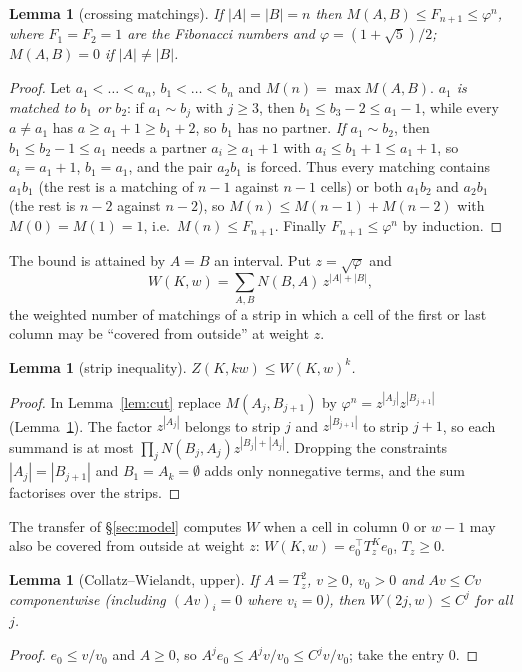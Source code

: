 \documentclass[11pt]{amsart}
\newtheorem{lemma}[theorem]{Lemma}
\theoremstyle{definition}
\theoremstyle{remark}
\begin{document}
\begin{lemma}[crossing matchings]\label{lem:fib}
If $|A| = |B| = n$ then $M(A, B) \le F_{n+1} \le \varphi^n$, where $F_1 = F_2 = 1$ are the
Fibonacci numbers and $\varphi = (1 + \sqrt 5)/2$; $M(A, B) = 0$ if $|A| \ne |B|$.
\end{lemma}
\begin{proof}
Let $a_1 < \dots < a_n$, $b_1 < \dots < b_n$ and $M(n) = \max M(A, B)$. \emph{$a_1$ is matched to
$b_1$ or $b_2$}: if $a_1 \sim b_j$ with $j \ge 3$, then $b_1 \le b_3 - 2 \le a_1 - 1$, while every
$a \ne a_1$ has $a \ge a_1 + 1 \ge b_1 + 2$, so $b_1$ has no partner. \emph{If $a_1 \sim b_2$},
then $b_1 \le b_2 - 1 \le a_1$ needs a partner $a_i \ge a_1 + 1$ with $a_i \le b_1 + 1 \le a_1 + 1$,
so $a_i = a_1 + 1$, $b_1 = a_1$, and the pair $a_2 b_1$ is forced. Thus every matching contains
$a_1 b_1$ (the rest is a matching of $n - 1$ against $n - 1$ cells) or both $a_1 b_2$ and
$a_2 b_1$ (the rest is $n-2$ against $n-2$), so $M(n) \le M(n-1) + M(n-2)$ with
$M(0) = M(1) = 1$, i.e.\ $M(n) \le F_{n+1}$. Finally $F_{n+1} \le \varphi^n$ by induction.
\end{proof}

The bound is attained by $A = B$ an interval. Put $z = \sqrt\varphi$ and
\[
  W(K, w) = \sum_{A, B} N(B, A)\, z^{|A| + |B|},
\]
the weighted number of matchings of a strip in which a cell of the first or last column may be
``covered from outside'' at weight $z$.

\begin{lemma}[strip inequality]\label{lem:strip}
$Z(K, kw) \le W(K, w)^k$.
\end{lemma}
\begin{proof}
In Lemma~\ref{lem:cut} replace $M(A_j, B_{j+1})$ by $\varphi^n = z^{|A_j|} z^{|B_{j+1}|}$
(Lemma~\ref{lem:fib}). The factor $z^{|A_j|}$ belongs to strip $j$ and $z^{|B_{j+1}|}$ to strip
$j+1$, so each summand is at most $\prod_j N(B_j, A_j) z^{|B_j| + |A_j|}$. Dropping the constraints
$|A_j| = |B_{j+1}|$ and $B_1 = A_k = \emptyset$ adds only nonnegative terms, and the sum
factorises over the strips.
\end{proof}

The transfer of \S\ref{sec:model} computes $W$ when a cell in column $0$ or $w-1$ may also be
covered from outside at weight $z$: $W(K, w) = e_0^\top T_z^K e_0$, $T_z \ge 0$.

\begin{lemma}[Collatz--Wielandt, upper]\label{lem:cwup}
If $A = T_z^2$, $v \ge 0$, $v_0 > 0$ and $Av \le Cv$ componentwise (including $(Av)_i = 0$
where $v_i = 0$), then $W(2j, w) \le C^j$ for all $j$.
\end{lemma}
\begin{proof}
$e_0 \le v/v_0$ and $A \ge 0$, so $A^j e_0 \le A^j v / v_0 \le C^j v / v_0$; take the entry $0$.
\end{proof}
\end{document}
